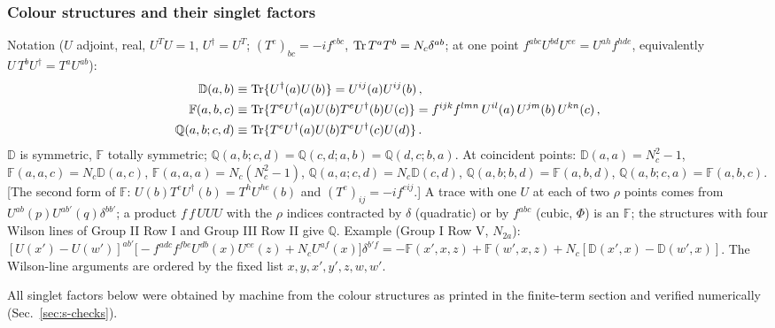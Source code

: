 \documentclass[10pt]{article}
\def\mf#1{\mathbb{#1}}
\begin{document}
\subsubsection{Colour structures and their singlet factors}
\noindent Notation ($U$ adjoint, real, $U^{T}U=1$, $U^{\dagger}=U^{T}$; $(T^{e})_{bc}=-if^{ebc}$, ${\rm Tr}\,T^{a}T^{b}=N_{c}\delta^{ab}$; at one point $f^{abc}U^{bd}U^{ce}=U^{ah}f^{hde}$, equivalently $U\,T^{b}U^{\dagger}=T^{a}U^{ab}$):
\begin{align}
\mf{D}(a,b)&\equiv{\rm Tr}\{U^{\dagger}(a)U(b)\}=U^{ij}(a)U^{ij}(b)\,,\notag\\
\mf{F}(a,b,c)&\equiv{\rm Tr}\{T^{e}U^{\dagger}(a)U(b)T^{e}U^{\dagger}(b)U(c)\}=f^{ijk}f^{lmn}\,U^{il}(a)\,U^{jm}(b)\,U^{kn}(c)\,,\notag\\
\mf{Q}(a,b;c,d)&\equiv{\rm Tr}\{T^{e}U^{\dagger}(a)U(b)T^{e}U^{\dagger}(c)U(d)\}\,.\notag
\end{align}
$\mf{D}$ is symmetric, $\mf{F}$ totally symmetric; $\mf{Q}(a,b;c,d)=\mf{Q}(c,d;a,b)=\mf{Q}(d,c;b,a)$. At coincident points: $\mf{D}(a,a)=N_{c}^{2}-1$, $\mf{F}(a,a,c)=N_{c}\mf{D}(a,c)$, $\mf{F}(a,a,a)=N_{c}(N_{c}^{2}-1)$, $\mf{Q}(a,a;c,d)=N_{c}\mf{D}(c,d)$, $\mf{Q}(a,b;b,d)=\mf{F}(a,b,d)$, $\mf{Q}(a,b;c,a)=\mf{F}(a,b,c)$. [The second form of $\mf{F}$: $U(b)T^{e}U^{\dagger}(b)=T^{h}U^{he}(b)$ and $(T^{e})_{ij}=-if^{eij}$.] A trace with one $U$ at each of two $\rho$ points comes from $U^{ab}(p)U^{ab'}(q)\delta^{bb'}$; a product $f\,f\,UUU$ with the $\rho$ indices contracted by $\delta$ (quadratic) or by $f^{abc}$ (cubic, $\Phi$) is an $\mf{F}$; the structures with four Wilson lines of Group II Row I and Group III Row II give $\mf{Q}$. Example (Group I Row V, $N_{2a}$): $[U(x')-U(w')]^{ab'}\big[-f^{adc}f^{fbe}U^{db}(x)U^{ce}(z)+N_{c}U^{af}(x)\big]\delta^{b'f}=-\mf{F}(x',x,z)+\mf{F}(w',x,z)+N_{c}[\mf{D}(x',x)-\mf{D}(w',x)]$. The Wilson-line arguments are ordered by the fixed list $x,y,x',y',z,w,w'$.

\noindent All singlet factors below were obtained by machine from the colour structures as printed in the finite-term section and verified numerically (Sec.~\ref{sec:s-checks}).
\end{document}
